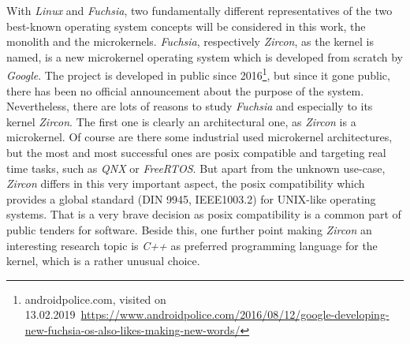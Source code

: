 With \textit{Linux} and \textit{Fuchsia}, two fundamentally different representatives of the two best-known operating system concepts will be considered in this work, the monolith and the microkernels. %
\textit{Fuchsia}, respectively \textit{Zircon}, as the kernel is named, is a new microkernel operating system which is developed from scratch by \textit{Google}.
The project is developed in public since 2016\footnote{androidpolice.com, visited on 13.02.2019~\url{https://www.androidpolice.com/2016/08/12/google-developing-new-fuchsia-os-also-likes-making-new-words/}}, but since it gone public, there has been no official announcement about the purpose of the system.
Nevertheless, there are lots of reasons to study \textit{Fuchsia} and especially to its kernel \textit{Zircon}.
The first one is clearly an architectural one, as \textit{Zircon} is a microkernel.
Of course are there some industrial used microkernel architectures, but the most and most successful ones are \ac{posix} compatible and targeting real time tasks, such as \textit{QNX} or \textit{FreeRTOS}. %
But apart from the unknown use-case, \textit{Zircon} differs in this very important aspect, the \ac{posix} compatibility which provides a global standard (DIN 9945, IEEE1003.2) for UNIX-like operating systems\cite{wolf2009c}.
That is a very brave decision as \ac{posix} compatibility is a common part of public tenders for software.
Beside this, one further point making \textit{Zircon} an interesting research topic is \textit{C++} as preferred programming language for the kernel, which is a rather unusual choice\cite{tanenbaum-modern-operating-systems}.

